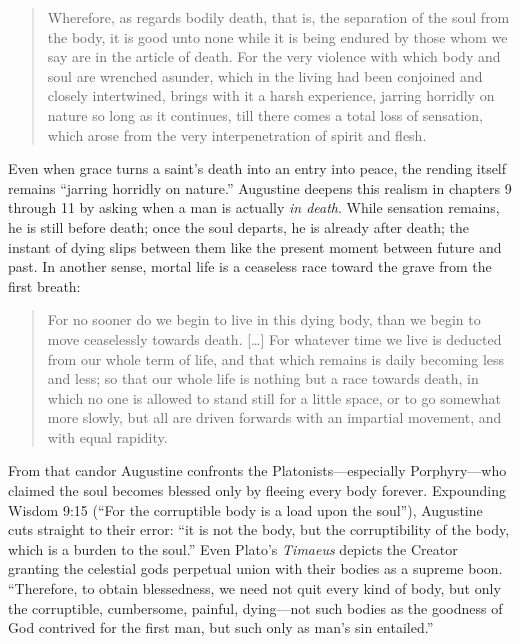 \begin{quote}
Wherefore, as regards bodily death, that is, the separation of the soul from the body, it is good unto none while it is being endured by those whom we say are in the article of death. For the very violence with which body and soul are wrenched asunder, which in the living had been conjoined and closely intertwined, brings with it a harsh experience, jarring horridly on nature so long as it continues, till there comes a total loss of sensation, which arose from the very interpenetration of spirit and flesh.
\end{quote}

Even when grace turns a saint's death into an entry into peace, the rending itself remains ``jarring horridly on nature.'' Augustine deepens this realism in chapters 9 through 11 by asking when a man is actually \emph{in death}. While sensation remains, he is still before death; once the soul departs, he is already after death; the instant of dying slips between them like the present moment between future and past. In another sense, mortal life is a ceaseless race toward the grave from the first breath:

\begin{quote}
For no sooner do we begin to live in this dying body, than we begin to move ceaselessly towards death. [\ldots] For whatever time we live is deducted from our whole term of life, and that which remains is daily becoming less and less; so that our whole life is nothing but a race towards death, in which no one is allowed to stand still for a little space, or to go somewhat more slowly, but all are driven forwards with an impartial movement, and with equal rapidity.
\end{quote}

From that candor Augustine confronts the Platonists---especially Porphyry---who claimed the soul becomes blessed only by fleeing every body forever. Expounding Wisdom 9:15 (``For the corruptible body is a load upon the soul''), Augustine cuts straight to their error: ``it is not the body, but the corruptibility of the body, which is a burden to the soul.'' Even Plato's \emph{Timaeus} depicts the Creator granting the celestial gods perpetual union with their bodies as a supreme boon. ``Therefore, to obtain blessedness, we need not quit every kind of body, but only the corruptible, cumbersome, painful, dying---not such bodies as the goodness of God contrived for the first man, but such only as man's sin entailed.''

